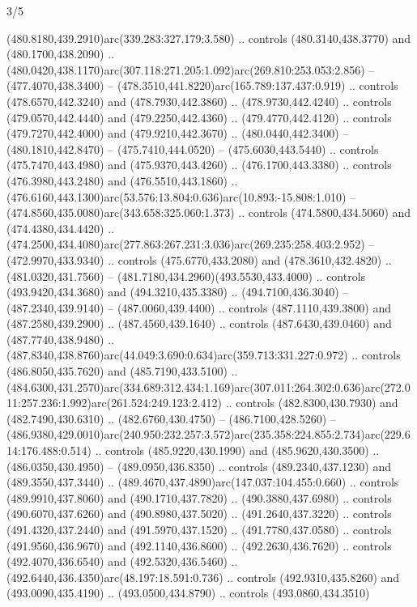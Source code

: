 \begin{flagdescription}{3/5}
\begin{scope}[shift={(0.5\flaglength,0.5\flagwidth)},scale=\flagwidth/510]
\begin{scope}[y=0.80pt, x=0.80pt, yscale=-1.06, xscale=1.06,yshift=-240pt,xshift=-400pt]
\begin{scope}[cm={{0.83333,0.0,0.0,0.83333,(154.64672,48.64761)}}]
\begin{scope}[cm={{0.93334,0.0,0.0,0.93334,(-4.86471,22.64035)}}]
\begin{scope}[draw=black]
  (480.8180,439.2910)arc(339.283:327.179:3.580) .. controls (480.3140,438.3770)
  and (480.1700,438.2090) ..
  (480.0420,438.1170)arc(307.118:271.205:1.092)arc(269.810:253.053:2.856) --
  (477.4070,438.3400) -- (478.3510,441.8220)arc(165.789:137.437:0.919) ..
  controls (478.6570,442.3240) and (478.7930,442.3860) .. (478.9730,442.4240) ..
  controls (479.0570,442.4440) and (479.2250,442.4360) .. (479.4770,442.4120) ..
  controls (479.7270,442.4000) and (479.9210,442.3670) .. (480.0440,442.3400) --
  (480.1810,442.8470) -- (475.7410,444.0520) -- (475.6030,443.5440) .. controls
  (475.7470,443.4980) and (475.9370,443.4260) .. (476.1700,443.3380) .. controls
  (476.3980,443.2480) and (476.5510,443.1860) ..
  (476.6160,443.1300)arc(53.576:13.804:0.636)arc(10.893:-15.808:1.010) --
  (474.8560,435.0080)arc(343.658:325.060:1.373) .. controls (474.5800,434.5060)
  and (474.4380,434.4420) ..
  (474.2500,434.4080)arc(277.863:267.231:3.036)arc(269.235:258.403:2.952) --
  (472.9970,433.9340) .. controls (475.6770,433.2080) and (478.3610,432.4820) ..
  (481.0320,431.7560) -- (481.7180,434.2960)(493.5530,433.4000) .. controls
  (493.9420,434.3680) and (494.3210,435.3380) .. (494.7100,436.3040) --
  (487.2340,439.9140) -- (487.0060,439.4400) .. controls (487.1110,439.3800) and
  (487.2580,439.2900) .. (487.4560,439.1640) .. controls (487.6430,439.0460) and
  (487.7740,438.9480) ..
  (487.8340,438.8760)arc(44.049:3.690:0.634)arc(359.713:331.227:0.972) ..
  controls (486.8050,435.7620) and (485.7190,433.5100) ..
  (484.6300,431.2570)arc(334.689:312.434:1.169)arc(307.011:264.302:0.636)arc(272.011:257.236:1.992)arc(261.524:249.123:2.412)
  .. controls (482.8300,430.7930) and (482.7490,430.6310) .. (482.6760,430.4750)
  -- (486.7100,428.5260) --
  (486.9380,429.0010)arc(240.950:232.257:3.572)arc(235.358:224.855:2.734)arc(229.614:176.488:0.514)
  .. controls (485.9220,430.1990) and (485.9620,430.3500) .. (486.0350,430.4950)
  -- (489.0950,436.8350) .. controls (489.2340,437.1230) and (489.3550,437.3440)
  .. (489.4670,437.4890)arc(147.037:104.455:0.660) .. controls
  (489.9910,437.8060) and (490.1710,437.7820) .. (490.3880,437.6980) .. controls
  (490.6070,437.6260) and (490.8980,437.5020) .. (491.2640,437.3220) .. controls
  (491.4320,437.2440) and (491.5970,437.1520) .. (491.7780,437.0580) .. controls
  (491.9560,436.9670) and (492.1140,436.8600) .. (492.2630,436.7620) .. controls
  (492.4070,436.6540) and (492.5320,436.5460) ..
  (492.6440,436.4350)arc(48.197:18.591:0.736) .. controls (492.9310,435.8260)
  and (493.0090,435.4190) .. (493.0500,434.8790) .. controls (493.0860,434.3510)

\end{scope}
\end{scope}
\end{scope}
\end{scope}
\end{scope}
\end{flagdescription}
